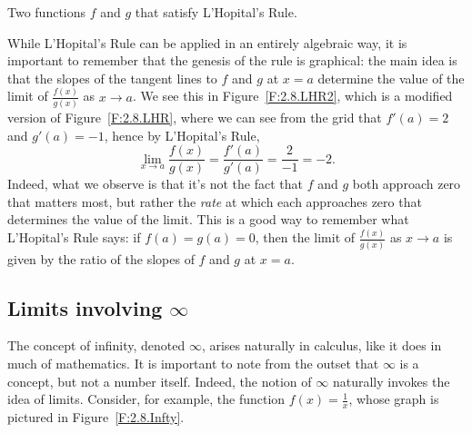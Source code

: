 
\begin{marginfigure} %
\caption{Two functions $f$ and $g$ that satisfy L'Hopital's Rule.} \label{F:2.8.LHR2}
\end{marginfigure}

While L'Hopital's Rule can be applied in an entirely algebraic way, it is important to remember that the genesis of the rule is graphical:  the main idea is that the slopes of the tangent lines to $f$ and $g$ at $x = a$ determine the value of the limit of $\frac{f(x)}{g(x)}$ as $x \to a$.  We see this in Figure~\ref{F:2.8.LHR2}, which is a modified version of Figure~\ref{F:2.8.LHR}, where we can see from the grid that $f'(a) = 2$ and $g'(a) = -1$, hence by L'Hopital's Rule, 
$$\lim_{x \to a}\frac{f(x)}{g(x)} = \frac{f'(a)}{g'(a)} = \frac{2}{-1} = -2.$$
Indeed, what we observe is that it's not the fact that $f$ and $g$ both approach zero that matters most, but rather the \emph{rate} at which each approaches zero that determines the value of the limit.  This is a good way to remember what L'Hopital's Rule says:  if $f(a) = g(a) = 0$, then the limit of $\frac{f(x)}{g(x)}$ as $x \to a$ is given by the ratio of the slopes of $f$ and $g$ at $x = a$.


\subsection*{Limits involving $\infty$}

The concept of infinity, denoted $\infty$, arises naturally in calculus, like it does in much of mathematics.  It is important to note from the outset that $\infty$ is a concept, but not a number itself.  Indeed, the notion of $\infty$ naturally invokes the idea of limits.  Consider, for example, the function $f(x) = \frac{1}{x}$, whose graph is pictured in Figure~\ref{F:2.8.Infty}.

